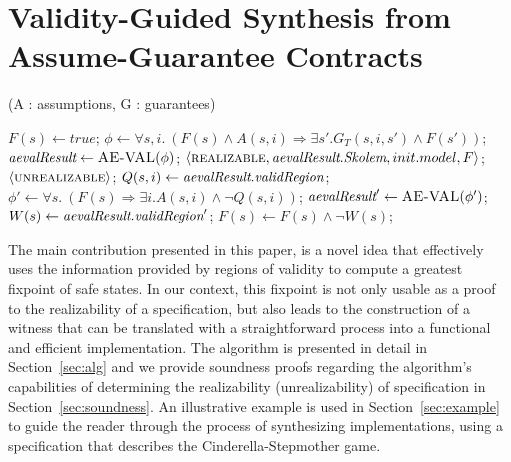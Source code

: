 \section{Validity-Guided Synthesis from Assume-Guarantee Contracts}
\label{sec:synthesis}

\begin{algorithm*}[!t]
\caption{\jsynvg (A : assumptions, G : guarantees)}
\label{alg:synthesis}
\begin{algorithmic}[1]
	\State $F(s) \gets true$;
		\State $\phi \gets \forall s,i. \ (F(s) \land A(s,i) \Rightarrow \exists s'.G_{T}(s,i,s') \land F(s'))$;
		\State $\textit{aevalResult} \gets \textsc{AE-VAL}(\phi)$;
		\If{$\isValid(\aevalres)$}
            \If{$\isSat(\init)$}
				\Return $\langle \textsc{realizable}, \textit{aevalResult}.\textit{Skolem}, init.model, F \rangle$;
		 		\Return $\langle \textsc{unrealizable} \rangle$;
		 	\EndIf
			\State $Q(s,i) \gets \textit{aevalResult}.\textit{validRegion}$;
			\State $\phi' \gets \forall s. \ (F(s) \Rightarrow \exists i. A(s,i) \land \lnot
			Q(s,i))$;
			\State $\textit{aevalResult}' \gets \textsc{AE-VAL}(\phi')$;
				\State $W(s) \gets \textit{aevalResult}.\textit{validRegion}'$;
			\State $F(s) \gets F(s) \land \lnot W(s)$;	
			
				
		\EndIf
	\EndWhile
\end{algorithmic}
\end{algorithm*}

The main contribution presented in this paper, is a novel idea that effectively
uses the information provided by regions of validity to compute a
greatest fixpoint of safe states. In our context, this fixpoint is not only
usable as a proof to the realizability of a specification, but also leads to the
construction of a witness that can be translated with a straightforward process
into a functional and efficient implementation. The algorithm is
presented in detail in Section~\ref{sec:alg} and we provide soundness
proofs regarding the algorithm's capabilities of determining the
realizability (unrealizability) of specification in
Section~\ref{sec:soundness}. An illustrative example is used in
Section~\ref{sec:example} to guide the reader through the process of
synthesizing implementations, using a specification that describes the Cinderella-Stepmother game.

